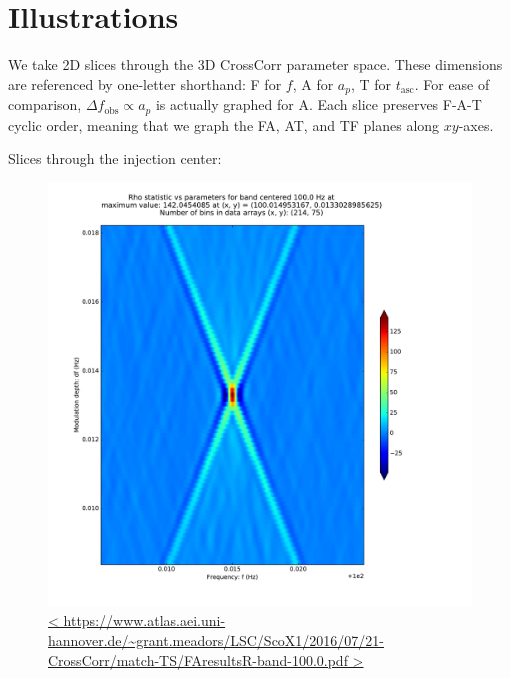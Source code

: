 \documentclass{article}
\begin{document}
\section{Illustrations}

We take 2D slices through the 3D CrossCorr parameter space.
These dimensions are referenced by one-letter shorthand: F for $f$, A for $a_p$, T for $t_\mathrm{asc}$.
For ease of comparison, $\Delta f_\mathrm{obs} \propto a_p$ is actually graphed for A.
Each slice preserves F-A-T cyclic order, meaning that we graph the FA, AT, and TF planes along $xy$-axes.


Slices through the injection center:

\begin{figure}
\includegraphics[trim= 0 0 0 0, clip, width=0.40\paperwidth,keepaspectratio]{plots/match-TS/FAresultsR-band-100-0.pdf}
\caption{
\url{<
https://www.atlas.aei.uni-hannover.de/~grant.meadors/LSC/ScoX1/2016/07/21-CrossCorr/match-TS/FAresultsR-band-100.0.pdf
>}
}
\end{figure}
\end{document}
